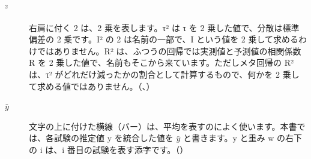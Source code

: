\begin{description}
\item[²] 右肩に付く 2 は、2 乗を表します。τ² は τ を 2 乗した値で、分散は標準偏差の 2 乗です。I² の 2 は名前の一部で、I という値を 2 乗して求めるわけではありません。R² は、ふつうの回帰では実測値と予測値の相関係数 R を 2 乗した値で、名前もそこから来ています。ただしメタ回帰の R² は、τ² がどれだけ減ったかの割合として計算するもので、何かを 2 乗して求める値ではありません。（、）
\item[$\bar{y}$] 文字の上に付けた横線（バー）は、平均を表すのによく使います。本書では、各試験の推定値 y を統合した値を $\bar{y}$ と書きます。y と重み w の右下の i は、i 番目の試験を表す添字です。（）
\end{description}

